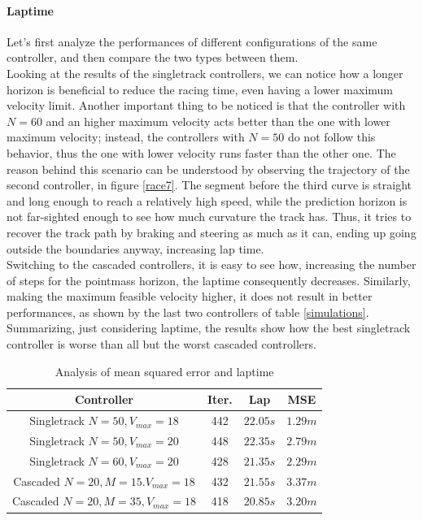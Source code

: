 \documentclass[a4paper, onecolumn, 12pt]{article}
\begin{document}
\paragraph{Laptime} \label{laptime}
Let's first analyze the performances of different configurations of the same 
controller, and then compare the two types between them. \\
Looking at the results of the singletrack controllers, we can notice how a
longer horizon is beneficial to reduce the racing time, even having a lower
maximum velocity limit. Another important thing to be noticed is that the
controller with $N=60$ and an higher maximum velocity acts better than the one
with lower maximum velocity; instead, the controllers with $N=50$ do not follow
this behavior, thus the one with lower velocity runs faster than the other one.
The reason behind this scenario can be understood by observing the trajectory of
the second controller, in figure \ref{race7}. The segment before the third curve
is straight and long enough to reach a relatively high speed, while the
prediction horizon is not far-sighted enough to see how much curvature the track
has. Thus, it tries to recover the track path by braking and steering as much as
it can, ending up going outside the boundaries anyway, increasing lap time. \\
Switching to the cascaded controllers, it is easy to see how, increasing the number
of steps for the pointmass horizon, the laptime consequently decreases. Similarly, 
making the maximum feasible velocity higher, it does not result in better performances, 
as shown by the last two controllers of table \ref{simulations}. \\
Summarizing, just considering laptime, the results show how the best singletrack
controller is worse than all but the worst cascaded controllers.
\begin{table}[H]
    \centering
    \caption{Analysis of mean squared error and laptime}
    \begin{tabular}{|c||c|c|c|}
        \hline
        \textbf{Controller} & \textbf{Iter.} & \textbf{Lap} & \textbf{MSE} \\ [0.5ex] 
        \hline
        \hline
        Singletrack $N=50, V_{max}=18$ & 442 & $22.05 s$ & $1.29 m$ \\
        \hline
        Singletrack $N=50, V_{max}=20$ & 448 & $22.35 s$ & $2.79 m$ \\
        \hline
        Singletrack $N=60, V_{max}=20$ & 428 & $21.35 s$ & $2.29 m$ \\
        \hline
        Cascaded $N=20, M=15. V_{max}=18$ & 432 & $21.55 s$ & $3.37 m$ \\
        \hline
        Cascaded $N=20, M=35, V_{max}=18$ & 418 & $20.85 s$ & $3.20 m$ \\
        \hline
    \end{tabular}
\end{table}
\end{document}
